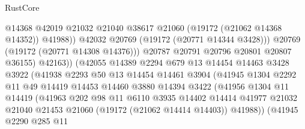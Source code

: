 \begin{lexlean}{RustCore}
\begin{coremodule}
                                    @14368
                                    @42019
                                    @21032
                                    @21040
                                    @38617
                                    @21060
                                    (@19172 (@21062 @14368 @14352))
                                    @41988))
                                @42032
                                @20769
                                (@19172 (@20771 @14344 @3428)))
                              @20769
                              (@19172 (@20771 @14308 @14376)))
                            @20787
                            @20791
                            @20796
                            @20801
                            @20807
                            @36155)
                          @42163))
                      (@42055
                        @14389
                        @2294
                        @679
                        @13
                        @14454
                        @14463
                        @3428
                        @3922
                        (@41938
                          @2293
                          @50
                          @13
                          @14454
                          @14461
                          @3904
                          (@41945
                            @1304
                            @2292
                            @11
                            @49
                            @14419
                            @14453
                            @14460
                            @3880
                            @14394
                            @3422
                            (@41956
                              @1304
                              @11
                              @14419
                              (@41963
                                @202
                                @98
                                @11
                                @6110
                                @3935
                                @14402
                                @14414
                                @41977
                                @21032
                                @21040
                                @21453
                                @21060
                                (@19172 (@21062 @14414 @14403))
                                @41988))
                            (@41945
                              @2290
                              @285
                              @11

\end{coremodule}
\end{lexlean}
